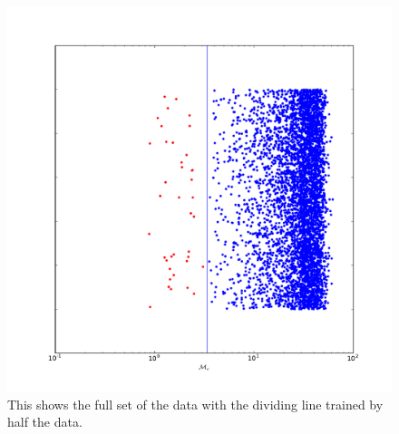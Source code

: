 \begin{figure}
\includegraphics[width=\columnwidth]{output/jake/classifier_all.pdf}
\caption{This shows the full set of the data with the dividing line trained by half the data.}
\label{fig:all}
\end{figure}
